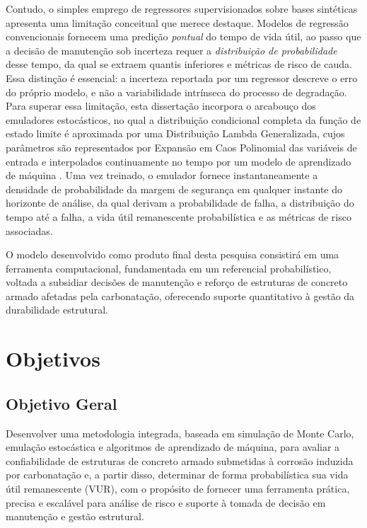 Contudo, o simples emprego de regressores supervisionados sobre bases sintéticas apresenta uma limitação conceitual que merece destaque. Modelos de regressão convencionais fornecem uma predição \textit{pontual} do tempo de vida útil, ao passo que a decisão de manutenção sob incerteza requer a \textit{distribuição de probabilidade} desse tempo, da qual se extraem quantis inferiores e métricas de risco de cauda. Essa distinção é essencial: a incerteza reportada por um regressor descreve o erro do próprio modelo, e não a variabilidade intrínseca do processo de degradação. Para superar essa limitação, esta dissertação incorpora o arcabouço dos emuladores estocásticos, no qual a distribuição condicional completa da função de estado limite é aproximada por uma Distribuição Lambda Generalizada, cujos parâmetros são representados por Expansão em Caos Polinomial das variáveis de entrada e interpolados continuamente no tempo por um modelo de aprendizado de máquina \cite{ZhuSudret2020, ZhuSudret2021}. Uma vez treinado, o emulador fornece instantaneamente a densidade de probabilidade da margem de segurança em qualquer instante do horizonte de análise, da qual derivam a probabilidade de falha, a distribuição do tempo até a falha, a vida útil remanescente probabilística e as métricas de risco associadas.

O modelo desenvolvido como produto final desta pesquisa consistirá em uma ferramenta computacional, fundamentada em um referencial probabilístico, voltada a subsidiar decisões de manutenção e reforço de estruturas de concreto armado afetadas pela carbonatação, oferecendo suporte quantitativo à gestão da durabilidade estrutural.


\section{Objetivos}

\subsection{Objetivo Geral}

Desenvolver uma metodologia integrada, baseada em simulação de Monte Carlo, emulação estocástica e algoritmos de aprendizado de máquina, para avaliar a confiabilidade de estruturas de concreto armado submetidas à corrosão induzida por carbonatação e, a partir disso, determinar de forma probabilística sua vida útil remanescente (VUR), com o propósito de fornecer uma ferramenta prática, precisa e escalável para análise de risco e suporte à tomada de decisão em manutenção e gestão estrutural.

